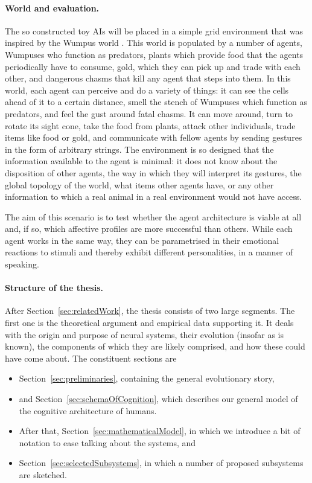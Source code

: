 \paragraph{World and evaluation.} The so constructed toy AIs will be placed in a simple grid environment that was inspired by the Wumpus world \cite{norvig}. This world is populated by a number of agents, Wumpuses who function as predators, plants which provide food that the agents periodically have to consume, gold, which they can pick up and trade with each other, and dangerous chasms that kill any agent that steps into them. In this world, each agent can perceive and do a variety of things: it can see the cells ahead of it to a certain distance, smell the stench of Wumpuses which function as predators, and feel the gust around fatal chasms. It can move around, turn to rotate its sight cone, take the food from plants, attack other individuals, trade items like food or gold, and communicate with fellow agents by sending gestures in the form of arbitrary strings. The environment is so designed that the information available to the agent is minimal: it does not know about the disposition of other agents, the way in which they will interpret its gestures, the global topology of the world, what items other agents have, or any other information to which a real animal in a real environment would not have access.

The aim of this scenario is to test whether the agent architecture is viable at all and, if so, which affective profiles are more successful than others. While each agent works in the same way, they can be parametrised in their emotional reactions to stimuli and thereby exhibit different personalities, in a manner of speaking. 

\paragraph{Structure of the thesis.} After Section~\ref{sec:relatedWork}, the thesis consists of two large segments. The first one is the theoretical argument and empirical data supporting it. It deals with the origin and purpose of neural systems, their evolution (insofar as is known), the components of which they are likely comprised, and how these could have come about. The constituent sections are
	\begin{itemize}
		\item Section~\ref{sec:preliminaries}, containing the general evolutionary story,
		\item and Section~\ref{sec:schemaOfCognition}, which describes our general model of the cognitive architecture of humans.
		\item After that, Section~\ref{sec:mathematicalModel}, in which we introduce a bit of notation to ease talking about the systems, and
		\item Section~\ref{sec:selectedSubsystems}, in which a number of proposed subsystems are sketched.
	\end{itemize}
	
